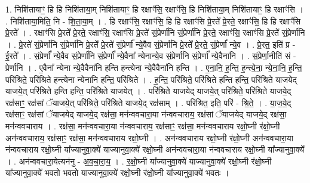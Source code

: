 \documentclass[17pt]{extarticle}
\begin{document}
1. निशि॑तायाꣳ॒॒ हि हि निशि॑ताया॒म् निशि॑तायाꣳ॒॒ हि रक्षाꣳ॑सि॒ रक्षाꣳ॑सि॒ हि निशि॑ताया॒म् निशि॑तायाꣳ॒॒ हि रक्षाꣳ॑सि । . निशि॑ताया॒मिति॒ नि - शि॒ता॒या॒म् । . हि रक्षाꣳ॑सि॒ रक्षाꣳ॑सि॒ हि हि रक्षाꣳ॑सि प्रे॒रते᳚ प्रे॒रते॒ रक्षाꣳ॑सि॒ हि हि रक्षाꣳ॑सि प्रे॒रते᳚ । . रक्षाꣳ॑सि प्रे॒रते᳚ प्रे॒रते॒ रक्षाꣳ॑सि॒ रक्षाꣳ॑सि प्रे॒रते॑ सं॒प्रेर्णा॑नि सं॒प्रेर्णा॑नि प्रे॒रते॒ रक्षाꣳ॑सि॒ रक्षाꣳ॑सि प्रे॒रते॑ सं॒प्रेर्णा॑नि । . प्रे॒रते॑ सं॒प्रेर्णा॑नि सं॒प्रेर्णा॑नि प्रे॒रते᳚ प्रे॒रते॑ सं॒प्रेर्णा᳚ न्ये॒वैव सं॒प्रेर्णा॑नि प्रे॒रते᳚ प्रे॒रते॒ सं॒प्रेर्णा᳚ न्ये॒व । . प्रे॒रत॒ इति॑ प्र - ई॒रते᳚ । . सं॒प्रेर्णा᳚ न्ये॒वैव सं॒प्रेर्णा॑नि सं॒प्रेर्णा᳚ न्ये॒वैना᳚ न्येनान्ये॒व सं॒प्रेर्णा॑नि सं॒प्रेर्णा᳚ न्ये॒वैना॑नि । . सं॒प्रेर्णा॒नीति॑ सं - प्रेर्णा॑नि । . ए॒वैना᳚ न्येना न्ये॒वैवैना॑नि हन्ति हन्त्येना न्ये॒वैवैना॑नि हन्ति । . ए॒ना॒नि॒ ह॒न्ति॒ ह॒न्त्ये॒ना॒ न्ये॒ना॒नि॒ ह॒न्ति॒ परि॑श्रिते॒ परि॑श्रिते हन्त्येना न्येनानि हन्ति॒ परि॑श्रिते । . ह॒न्ति॒ परि॑श्रिते॒ परि॑श्रिते हन्ति हन्ति॒ परि॑श्रिते याजयेद् याजये॒त् परि॑श्रिते हन्ति हन्ति॒ परि॑श्रिते याजयेत् । . परि॑श्रिते याजयेद् याजये॒त् परि॑श्रिते॒ परि॑श्रिते याजये॒द् रक्ष॑साꣳ॒॒ रक्ष॑सां ॅयाजये॒त् परि॑श्रिते॒ परि॑श्रिते याजये॒द् रक्ष॑साम् । . परि॑श्रित॒ इति॒ परि॑ - श्रि॒ते॒ । . या॒ज॒ये॒द् रक्ष॑साꣳ॒॒ रक्ष॑सां ॅयाजयेद् याजये॒द् रक्ष॑सा॒ मन॑न्ववचारा॒या न॑न्ववचाराय॒ रक्ष॑सां ॅयाजयेद् याजये॒द् रक्ष॑सा॒ मन॑न्ववचाराय । . रक्ष॑सा॒ मन॑न्ववचारा॒या न॑न्ववचाराय॒ रक्ष॑साꣳ॒॒ रक्ष॑सा॒ मन॑न्ववचाराय रक्षो॒घ्नी र॑क्षो॒घ्नी अन॑न्ववचाराय॒ रक्ष॑साꣳ॒॒ रक्ष॑सा॒ मन॑न्ववचाराय रक्षो॒घ्नी । . अन॑न्ववचाराय रक्षो॒घ्नी र॑क्षो॒घ्नी अन॑न्ववचारा॒या न॑न्ववचाराय रक्षो॒घ्नी या᳚ज्यानुवा॒क्ये॑ याज्यानुवा॒क्ये॑ रक्षो॒घ्नी अन॑न्ववचारा॒या न॑न्ववचाराय रक्षो॒घ्नी या᳚ज्यानुवा॒क्ये᳚ । . अन॑न्ववचारा॒येत्यन॑नु - अ॒व॒चा॒रा॒य॒ । . र॒क्षो॒घ्नी या᳚ज्यानुवा॒क्ये॑ याज्यानुवा॒क्ये॑ रक्षो॒घ्नी र॑क्षो॒घ्नी या᳚ज्यानुवा॒क्ये॑ भवतो भवतो याज्यानुवा॒क्ये॑ रक्षो॒घ्नी र॑क्षो॒घ्नी या᳚ज्यानुवा॒क्ये॑ भवतः । \newline
\end{document}

